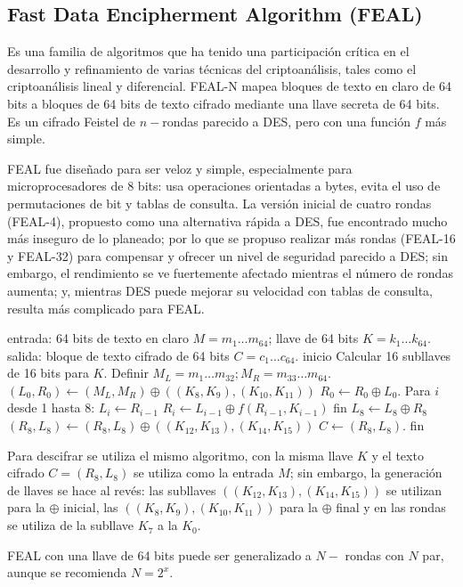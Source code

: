 \subsection{Fast Data Encipherment Algorithm (FEAL)}

Es una familia de algoritmos que ha tenido una participación crítica
en el desarrollo y refinamiento de varias técnicas del criptoanálisis, 
tales como el criptoanálisis lineal y diferencial. FEAL-N mapea
bloques de texto en claro de 64 bits a bloques de 64 bits de texto
cifrado mediante una llave secreta de 64 bits. Es un cifrado Feistel de 
$n-$rondas parecido a DES, pero con una función $f$ más simple.

FEAL fue diseñado para ser veloz y simple, especialmente para 
microprocesadores de 8 bits: usa operaciones orientadas a bytes, evita
el uso de permutaciones de bit y tablas de consulta. La versión inicial
de cuatro rondas (FEAL-4), propuesto como una alternativa rápida a DES, 
fue encontrado mucho más inseguro de lo planeado; por lo que se propuso
realizar más rondas (FEAL-16 y FEAL-32) para compensar y ofrecer un nivel
de seguridad parecido a DES; sin embargo, el rendimiento se ve fuertemente
afectado mientras el número de rondas aumenta; y, mientras DES puede 
mejorar su velocidad con tablas de consulta, resulta más complicado 
para FEAL.

\begin{pseudocodigo}[caption={FEAL-8, cifrado.}, label={feal8:1}]
  entrada:	64 bits de texto en claro $M = m_1 \dots m_64$; llave de 64 bits $K = k_1 \dots k_64$.
  salida: 	bloque de texto cifrado de 64 bits $C = c_1 \dots c_64$.
  inicio
    Calcular 16 subllaves de 16 bits para $K$.
    Definir $M_L = m_1 \dots m_32; M_R = m_33 \dots m_64$.
    $(L_0, R_0) \leftarrow (M_L, M_R) \oplus ((K_8, K_9), (K_10, K_11))$
    $R_0 \leftarrow R_0 \oplus L_0$.
    Para $i$ desde 1 hasta 8:
      $L_i \leftarrow R_{i-1}$
      $R_i \leftarrow L_{i-1} \oplus f(R_{i-1}, K_{i-1})$
    fin
    $L_8 \leftarrow L_8 \oplus R_8$
    $(R_8, L_8) \leftarrow (R_8, L_8) \oplus ((K_12, K_13), (K_14, K_15))$
    $C \leftarrow (R_8, L_8)$.
  fin
\end{pseudocodigo}

Para descifrar se utiliza el mismo algoritmo, con la misma llave $K$ y el
texto cifrado $C = (R_8, L_8)$ se utiliza como la entrada $M$; sin 
embargo, la generación de llaves se hace al revés: las subllaves 
$((K_12, K_13), (K_14, K_15))$ se utilizan para la $\oplus$ inicial, las 
$((K_8, K_9), (K_10, K_11))$ para la $\oplus$ final y en las rondas se 
utiliza de la subllave $K_7$ a la $K_0$.

FEAL con una llave de 64 bits puede ser generalizado a $N-$ rondas con 
$N$ par, aunque se recomienda $N = 2^x$.